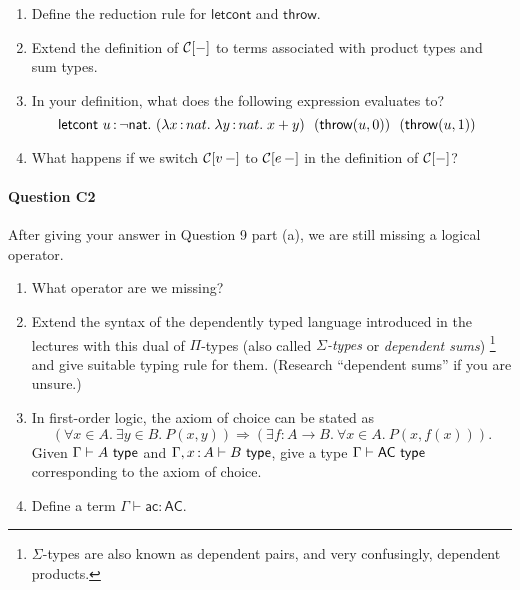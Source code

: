 \documentclass[11pt,a4paper,twoside]{article}
\begin{document}
\begin{enumerate}[label=(\alph*)]
  \item Define the reduction rule for $\mathsf{letcont}$ and $\mathsf{throw}$.

  \item Extend the definition of $\mathcal{C}[-]$ to terms associated with product types and sum types.

  \item In your definition, what does the following expression evaluates to?
    \[
      \mathsf{letcont}\ \var{u}{\neg \mathsf{nat}}.\ 
        (\lam{x}{nat}{\lam{y}{nat}{x + y}})\ \
        (\mathsf{throw}(u, 0))\ \
        (\mathsf{throw}(u, 1))\ \
    \]

  \item What happens if we switch $\mathcal{C}[v \, -]$ to $\mathcal{C}[e \, -]$
  in the definition of $\mathcal{C}[-]$?

\end{enumerate}

\paragraph{Question C2} After giving your answer in Question 9 part (a), we are still missing a logical operator.
\begin{enumerate}[label=(\alph*)]
  \item What operator are we missing?

  \item Extend the syntax of the dependently typed language introduced in the lectures with this dual of $\Pi$-types 
  (also called \emph{$\Sigma$-types} or \emph{dependent sums}) 
  \footnote{$\Sigma$-types are also known as dependent pairs, and very confusingly, dependent products.}
  and give suitable typing rule for them.
  (Research ``dependent sums'' if you are unsure.)

  \item In first-order logic, the axiom of choice can be stated as
    \[
      (\forall x \in A.\ \exists y \in B.\ P (x, y))
        \Rightarrow
      (\exists f : A \to B.\ \forall x \in A.\ P(x, f(x))). 
    \]
  Given $\Gamma \vdash A\ \mathsf{type}$ and $\Gamma, x \,{:}\, A \vdash B\ \mathsf{type}$,
  give a type $\Gamma \vdash \mathsf{AC}\ \type$ corresponding to the axiom of choice.

  \item Define a term $\Gamma \vdash \mathsf{ac} : \mathsf{AC}$.
\end{enumerate}
\end{document}
